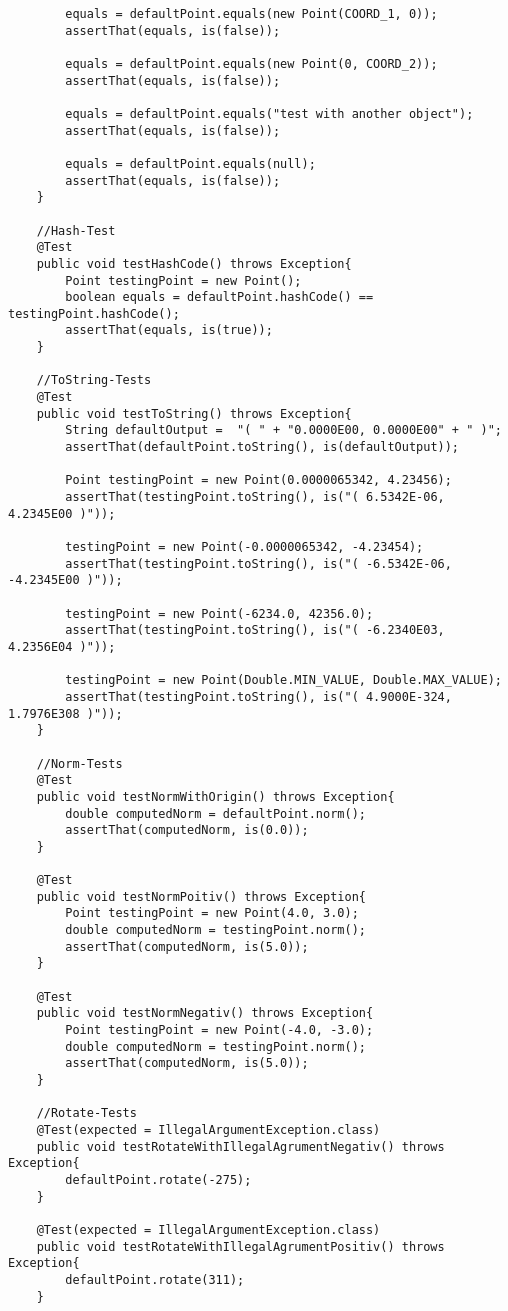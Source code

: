 \begin{lstlisting}
		equals = defaultPoint.equals(new Point(COORD_1, 0));
		assertThat(equals, is(false));
		
		equals = defaultPoint.equals(new Point(0, COORD_2));
		assertThat(equals, is(false));
		
		equals = defaultPoint.equals("test with another object");
		assertThat(equals, is(false));
		
		equals = defaultPoint.equals(null);
		assertThat(equals, is(false));
	}
	
	//Hash-Test
	@Test
	public void testHashCode() throws Exception{
		Point testingPoint = new Point();
		boolean equals = defaultPoint.hashCode() == testingPoint.hashCode();
		assertThat(equals, is(true));
	}
	
	//ToString-Tests
	@Test
	public void testToString() throws Exception{
		String defaultOutput =  "( " + "0.0000E00, 0.0000E00" + " )";
		assertThat(defaultPoint.toString(), is(defaultOutput));
		
		Point testingPoint = new Point(0.0000065342, 4.23456);
		assertThat(testingPoint.toString(), is("( 6.5342E-06, 4.2345E00 )"));
		
		testingPoint = new Point(-0.0000065342, -4.23454);
		assertThat(testingPoint.toString(), is("( -6.5342E-06, -4.2345E00 )"));
		
		testingPoint = new Point(-6234.0, 42356.0);
		assertThat(testingPoint.toString(), is("( -6.2340E03, 4.2356E04 )"));
		
		testingPoint = new Point(Double.MIN_VALUE, Double.MAX_VALUE);
		assertThat(testingPoint.toString(), is("( 4.9000E-324, 1.7976E308 )"));
	}
	
	//Norm-Tests
	@Test
	public void testNormWithOrigin() throws Exception{
		double computedNorm = defaultPoint.norm();
		assertThat(computedNorm, is(0.0));
	}
	
	@Test
	public void testNormPoitiv() throws Exception{
		Point testingPoint = new Point(4.0, 3.0);
		double computedNorm = testingPoint.norm();
		assertThat(computedNorm, is(5.0));
	}
	
	@Test
	public void testNormNegativ() throws Exception{
		Point testingPoint = new Point(-4.0, -3.0);
		double computedNorm = testingPoint.norm();
		assertThat(computedNorm, is(5.0));
	}
	
	//Rotate-Tests
	@Test(expected = IllegalArgumentException.class)
	public void testRotateWithIllegalAgrumentNegativ() throws Exception{
		defaultPoint.rotate(-275);
	}
	
	@Test(expected = IllegalArgumentException.class)
	public void testRotateWithIllegalAgrumentPositiv() throws Exception{
		defaultPoint.rotate(311);
	}
	

\end{lstlisting}
